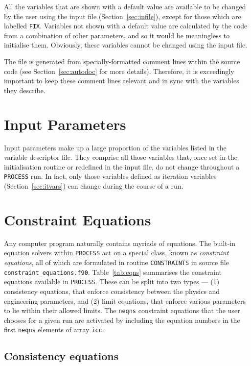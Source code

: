 \documentclass[11pt,a4paper]{report}
\newcommand{\process}{\mbox{\texttt{PROCESS}}}
\begin{document}
All the variables that are shown with a default value are available to be
changed by the user using the input file (Section~\ref{sec:infile}), except
for those which are labelled \texttt{FIX}. Variables not shown with a default
value are calculated by the code from a combination of other parameters, and
so it would be meaningless to initialise them.  Obviously, these variables
cannot be changed using the input file.

The file is generated from specially-formatted comment lines within the source
code (see Section~\ref{sec:autodoc} for more details). Therefore, it is
exceedingly important to keep these comment lines relevant and in sync with
the variables they describe.

\section{Input Parameters}
\label{sec:inpars}

Input parameters make up a large proportion of the variables listed in the
variable descriptor file. They comprise all those variables that, once set in
the initialisation routine or redefined in the input file, do not change
throughout a \process\/ run. In fact, only those variables defined as iteration
variables (Section~\ref{sec:itvars}) can change during the course of a run.

\section{Constraint Equations}
\label{sec:constraints}

Any computer program naturally contains myriads of equations. The built-in
equation solvers within \process\/ act on a special class, known as
\textit{constraint equations}, all of which are formulated in routine
\texttt{CONSTRAINTS} in source file
\texttt{constraint\_equations.f90}. Table~\ref{tab:eqns} summarises the
constraint equations available in \process. These can be split into two types
--- (1) consistency equations, that enforce consistency between the physics
and engineering parameters, and (2) limit equations, that enforce various
parameters to lie within their allowed limits. The \texttt{neqns} constraint
equations that the user chooses for a given run are activated by including the
equation numbers in the first \texttt{neqns} elements of array \texttt{icc}.

\subsection{Consistency equations}
\end{document}
